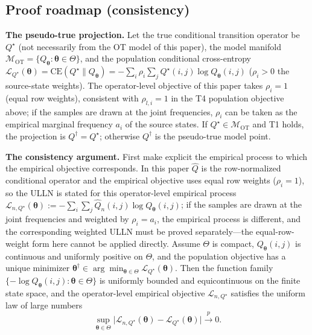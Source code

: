 \documentclass[11pt,a4paper]{article}
\theoremstyle{remark}
\begin{document}
\subsection{Proof roadmap (consistency)}

\textbf{The pseudo-true projection.} Let the true conditional transition operator be
$Q^{\star}$ (not necessarily from the OT model of this paper), the model manifold
$\mathcal{M}_{\mathrm{OT}}=\{Q_{\bm{\theta}}:\bm{\theta}\in\Theta\}$, and the population
conditional cross-entropy
$\mathcal{L}_{Q^{\star}}(\bm{\theta})=\mathrm{CE}(Q^{\star}\|Q_{\bm{\theta}})=-\sum_i\rho_i\sum_jQ^{\star}(i,j)\log Q_{\bm{\theta}}(i,j)$
($\rho_i>0$ the source-state weights). The operator-level objective of this paper takes
$\rho_i=1$ (equal row weights), consistent with $\rho_{l,i}=1$ in the T4 population
objective above; if the samples are drawn at the joint frequencies, $\rho_i$ can be taken
as the empirical marginal frequency $a_i$ of the source states. If
$Q^{\star}\in\mathcal{M}_{\mathrm{OT}}$ and T1 holds, the projection is
$Q^{\dagger}=Q^{\star}$; otherwise $Q^{\dagger}$ is the pseudo-true model point.

\textbf{The consistency argument.} First make explicit the empirical process to which the
empirical objective corresponds. In this paper $\widehat Q$ is the row-normalized
conditional operator and the empirical objective uses equal row weights ($\rho_i=1$), so
the ULLN is stated for this operator-level empirical process
$\mathcal{L}_{n,Q^{\star}}(\bm{\theta}):=-\sum_i\sum_j\widehat Q_n(i,j)\log Q_{\bm{\theta}}(i,j)$;
if the samples are drawn at the joint frequencies and weighted by $\rho_i=a_i$, the
empirical process is different, and the corresponding weighted ULLN must be proved
separately---the equal-row-weight form here cannot be applied directly. Assume $\Theta$ is
compact, $Q_{\bm{\theta}}(i,j)$ is continuous and uniformly positive on $\Theta$, and the
population objective has a unique minimizer
$\bm{\theta}^{\dagger}\in\arg\min_{\bm{\theta}\in\Theta}\mathcal{L}_{Q^{\star}}(\bm{\theta})$.
Then the function family $\{-\log Q_{\bm{\theta}}(i,j):\bm{\theta}\in\Theta\}$ is uniformly
bounded and equicontinuous on the finite state space, and the operator-level empirical
objective $\mathcal{L}_{n,Q^{\star}}$ satisfies the uniform law of large numbers
\[
\sup_{\bm{\theta}\in\Theta}\bigl|\mathcal{L}_{n,Q^{\star}}(\bm{\theta})-\mathcal{L}_{Q^{\star}}(\bm{\theta})\bigr|\xrightarrow{p}0.
\]
\end{document}
